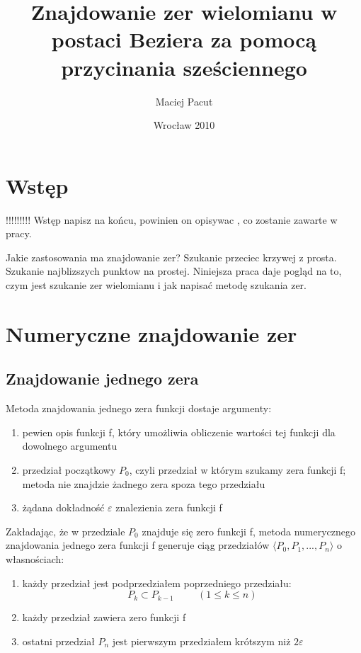 \documentclass[11pt,a4paper,oneside]{report}
\title{Znajdowanie zer wielomianu w postaci Beziera za pomocą przycinania sześciennego}
\author{Maciej Pacut}
\date{Wrocław 2010}
\begin{document}
\maketitle
\newpage

\section{Wstęp}

!!!!!!!!! Wstęp napisz na końcu, powinien on opisywac , co zostanie zawarte w pracy.

Jakie zastosowania ma znajdowanie zer? Szukanie przeciec krzywej z prosta. Szukanie najblizszych punktow na prostej.
Niniejsza praca daje pogląd na to, czym jest szukanie zer wielomianu i jak napisać metodę szukania zer.

\section{Numeryczne znajdowanie zer}

\subsection{Znajdowanie jednego zera}

Metoda znajdowania jednego zera funkcji dostaje argumenty:
\begin{enumerate}
\item pewien opis funkcji f, który umożliwia obliczenie wartości tej funkcji dla dowolnego argumentu
\item przedział początkowy $P_0$, czyli przedział w którym szukamy zera funkcji f; metoda nie znajdzie żadnego zera spoza tego przedziału
\item żądana dokładność $\varepsilon$ znalezienia zera funkcji f
\end{enumerate}

Zakładając, że w przedziale $P_0$ znajduje się zero funkcji f, metoda numerycznego znajdowania jednego zera funkcji f generuje ciąg przedziałów $\langle P_0, P_1, ..., P_n\rangle$ o własnościach:
\begin{enumerate}
\item każdy przedział jest podprzedziałem poprzedniego przedziału:
$$P_k \subset P_{k-1}\hspace{1cm}(1 \leq k \leq n)$$
\item każdy przedział zawiera zero funkcji f
\item ostatni przedział $P_n$ jest pierwszym przedziałem krótszym niż $2 \varepsilon$
\end{enumerate}
\end{document}
